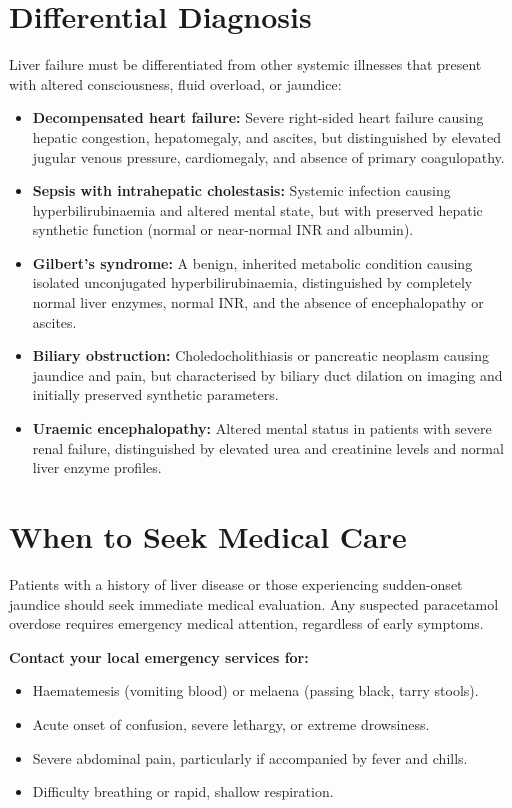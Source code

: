 \section*{Differential Diagnosis}
Liver failure must be differentiated from other systemic illnesses that present with altered consciousness, fluid overload, or jaundice:
\begin{itemize}
    \item \textbf{Decompensated heart failure:} Severe right-sided heart failure causing hepatic congestion, hepatomegaly, and ascites, but distinguished by elevated jugular venous pressure, cardiomegaly, and absence of primary coagulopathy.
    \item \textbf{Sepsis with intrahepatic cholestasis:} Systemic infection causing hyperbilirubinaemia and altered mental state, but with preserved hepatic synthetic function (normal or near-normal INR and albumin).
    \item \textbf{Gilbert's syndrome:} A benign, inherited metabolic condition causing isolated unconjugated hyperbilirubinaemia, distinguished by completely normal liver enzymes, normal INR, and the absence of encephalopathy or ascites.
    \item \textbf{Biliary obstruction:} Choledocholithiasis or pancreatic neoplasm causing jaundice and pain, but characterised by biliary duct dilation on imaging and initially preserved synthetic parameters.
    \item \textbf{Uraemic encephalopathy:} Altered mental status in patients with severe renal failure, distinguished by elevated urea and creatinine levels and normal liver enzyme profiles.
\end{itemize}

\section*{When to Seek Medical Care}
Patients with a history of liver disease or those experiencing sudden-onset jaundice should seek immediate medical evaluation. Any suspected paracetamol overdose requires emergency medical attention, regardless of early symptoms.

\textbf{Contact your local emergency services for:}
\begin{itemize}
    \item Haematemesis (vomiting blood) or melaena (passing black, tarry stools).
    \item Acute onset of confusion, severe lethargy, or extreme drowsiness.
    \item Severe abdominal pain, particularly if accompanied by fever and chills.
    \item Difficulty breathing or rapid, shallow respiration.
\end{itemize}

